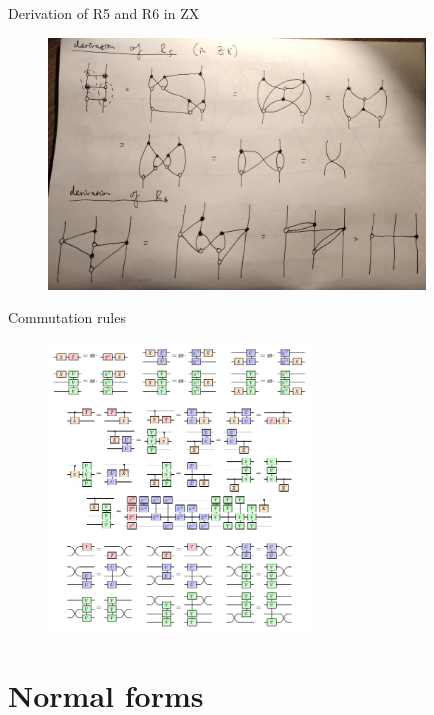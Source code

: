 \documentclass{beamer}
\theoremstyle{definition}
\begin{document}
\begin{frame}{Derivation of R5 and R6 in ZX}

\begin{figure}
\includegraphics[width=10cm]{R5-R6}
\centering
\end{figure}
\end{frame}

\begin{frame}{Commutation rules}

\begin{figure}
\includegraphics[width=7cm]{commutation-rules}
\centering
\end{figure}
\end{frame}

\section{Normal forms}
\end{document}
